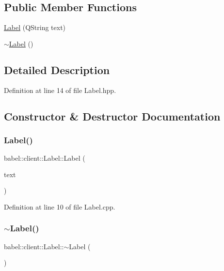 \subsection*{Public Member Functions}
\begin{DoxyCompactItemize}
\item 
\mbox{\hyperlink{classbabel_1_1client_1_1_label_a125f711d696cbd4d3559e0a3fb1398d1}{Label}} (Q\+String text)
\item 
\mbox{\hyperlink{classbabel_1_1client_1_1_label_a8b61babd53b45659008126987ce2c6fb}{$\sim$\+Label}} ()
\end{DoxyCompactItemize}


\subsection{Detailed Description}


Definition at line 14 of file Label.\+hpp.



\subsection{Constructor \& Destructor Documentation}
\mbox{\label{classbabel_1_1client_1_1_label_a125f711d696cbd4d3559e0a3fb1398d1}} 
\subsubsection{\texorpdfstring{Label()}{Label()}}
{\footnotesize\ttfamily babel\+::client\+::\+Label\+::\+Label (\begin{DoxyParamCaption}\item[{Q\+String}]{text }\end{DoxyParamCaption})}



Definition at line 10 of file Label.\+cpp.

\mbox{\label{classbabel_1_1client_1_1_label_a8b61babd53b45659008126987ce2c6fb}} 
\subsubsection{\texorpdfstring{$\sim$\+Label()}{~Label()}}
{\footnotesize\ttfamily babel\+::client\+::\+Label\+::$\sim$\+Label (\begin{DoxyParamCaption}{ }\end{DoxyParamCaption})}



